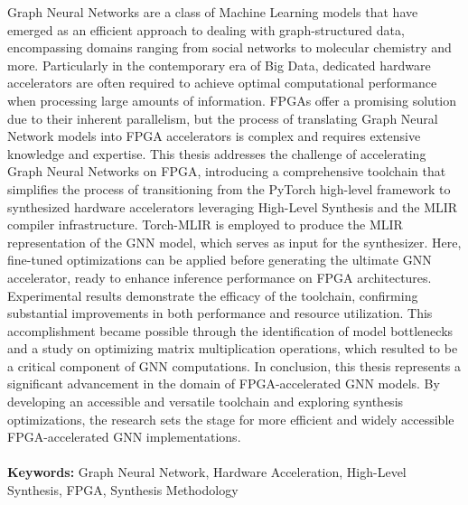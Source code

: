 Graph Neural Networks are a class of Machine Learning models that have emerged as an efficient approach to dealing with graph-structured data, encompassing domains ranging from social networks to molecular chemistry and more.
Particularly in the contemporary era of Big Data, dedicated hardware accelerators are often required to achieve optimal computational performance when processing large amounts of information.
FPGAs offer a promising solution due to their inherent parallelism, but the process of translating Graph Neural Network models into FPGA accelerators is complex and requires extensive knowledge and expertise.
This thesis addresses the challenge of accelerating Graph Neural Networks on FPGA, introducing a comprehensive toolchain that simplifies the process of transitioning from the PyTorch high-level framework to synthesized hardware accelerators leveraging High-Level Synthesis and the MLIR compiler infrastructure.
Torch-MLIR is employed to produce the MLIR representation of the GNN model, which serves as input for the synthesizer.
Here, fine-tuned optimizations can be applied before generating the ultimate GNN accelerator, ready to enhance inference performance on FPGA architectures.
Experimental results demonstrate the efficacy of the toolchain, confirming substantial improvements in both performance and resource utilization.
This accomplishment became possible through the identification of model bottlenecks and a study on optimizing matrix multiplication operations, which resulted to be a critical component of GNN computations.
In conclusion, this thesis represents a significant advancement in the domain of FPGA-accelerated GNN models.
By developing an accessible and versatile toolchain and exploring synthesis optimizations, the research sets the stage for more efficient and widely accessible FPGA-accelerated GNN implementations.
\\
\\
\textbf{Keywords:} Graph Neural Network, Hardware Acceleration, High-Level Synthesis, FPGA, Synthesis Methodology %